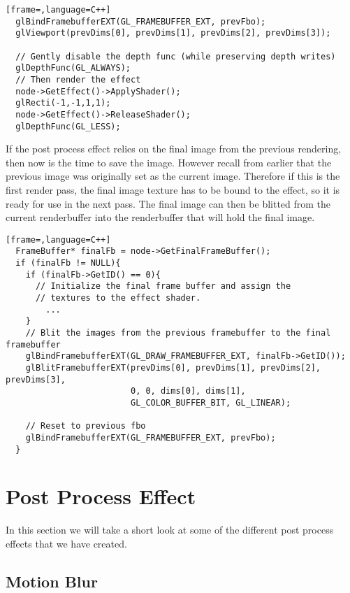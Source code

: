 \begin{lstlisting}[frame=,language=C++]
  glBindFramebufferEXT(GL_FRAMEBUFFER_EXT, prevFbo);
  glViewport(prevDims[0], prevDims[1], prevDims[2], prevDims[3]);
  
  // Gently disable the depth func (while preserving depth writes)
  glDepthFunc(GL_ALWAYS);
  // Then render the effect
  node->GetEffect()->ApplyShader();
  glRecti(-1,-1,1,1);
  node->GetEffect()->ReleaseShader();
  glDepthFunc(GL_LESS);
\end{lstlisting}


If the post process effect relies on the final image from the previous
rendering, then now is the time to save the image. However recall from
earlier that the previous image was originally set as the current
image. Therefore if this is the first render pass, the final image
texture has to be bound to the effect, so it is ready for use in the
next pass. The final image can then be blitted from the current
renderbuffer into the renderbuffer that will hold the final image.

\begin{lstlisting}[frame=,language=C++]
  FrameBuffer* finalFb = node->GetFinalFrameBuffer();
  if (finalFb != NULL){
    if (finalFb->GetID() == 0){
      // Initialize the final frame buffer and assign the
      // textures to the effect shader.
        ...
    }
    // Blit the images from the previous framebuffer to the final framebuffer
    glBindFramebufferEXT(GL_DRAW_FRAMEBUFFER_EXT, finalFb->GetID());
    glBlitFramebufferEXT(prevDims[0], prevDims[1], prevDims[2], prevDims[3], 
                         0, 0, dims[0], dims[1], 
                         GL_COLOR_BUFFER_BIT, GL_LINEAR);
    
    // Reset to previous fbo
    glBindFramebufferEXT(GL_FRAMEBUFFER_EXT, prevFbo);
  }
\end{lstlisting}

\section{Post Process Effect}

In this section we will take a short look at some of the different
post process effects that we have created.

\subsection{Motion Blur}

